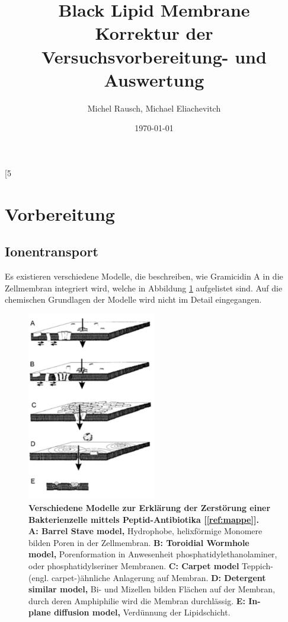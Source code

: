 [5~\documentclass[a4paper,ngerman]{scrartcl}
\title{Black Lipid Membrane\\Korrektur der Versuchsvorbereitung- und Auswertung}
\date{\today}
\author{Michel Rausch, Michael Eliachevitch}
\begin{document}
\maketitle
\tableofcontents
\newpage

\section{Vorbereitung}

\subsection{Ionentransport}

Es existieren verschiedene Modelle, die beschreiben, wie Gramicidin A in die Zellmembran integriert wird, welche in Abbildung \ref{fig:wirkmechanismus} aufgelistet sind. Auf die chemischen Grundlagen der Modelle wird nicht im Detail eingegangen.
  

\begin{figure}[tbh!]
\includegraphics[width=0.5\textwidth]{abbildungen/wirkmechanismus.png}
\caption{\textbf{Verschiedene Modelle zur Erklärung der Zerstörung einer Bakterienzelle mittels Peptid-Antibiotika [\ref{ref:mappe}].}\\
\textbf{A: Barrel Stave model,} 
Hydrophobe, helixförmige Monomere bilden Poren in der Zellmembran.
\textbf{B: Toroidial Wormhole model,}  
Porenformation in Anwesenheit phosphatidylethanolaminer, oder phosphatidylseriner Membranen. 
\textbf{C: Carpet model}  
Teppich-(engl. carpet-)ähnliche Anlagerung auf Membran.
\textbf{D:  Detergent similar model,}
Bi- und Mizellen bilden Flächen auf der Membran, durch deren Amphiphilie wird die Membran durchlässig.
\textbf{E:  In-plane diffusion model,}
Verdünnung der Lipidschicht.
}
\label{fig:wirkmechanismus}
\end{figure}
\end{document}
